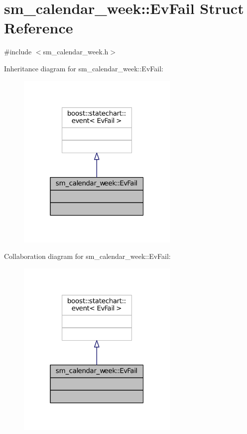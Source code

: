 \hypertarget{structsm__calendar__week_1_1EvFail}{}\section{sm\+\_\+calendar\+\_\+week\+:\+:Ev\+Fail Struct Reference}
\label{structsm__calendar__week_1_1EvFail}


{\ttfamily \#include $<$sm\+\_\+calendar\+\_\+week.\+h$>$}



Inheritance diagram for sm\+\_\+calendar\+\_\+week\+:\+:Ev\+Fail\+:
\nopagebreak
\begin{figure}[H]
\begin{center}
\leavevmode
\includegraphics[width=220pt]{structsm__calendar__week_1_1EvFail__inherit__graph}
\end{center}
\end{figure}


Collaboration diagram for sm\+\_\+calendar\+\_\+week\+:\+:Ev\+Fail\+:
\nopagebreak
\begin{figure}[H]
\begin{center}
\leavevmode
\includegraphics[width=220pt]{structsm__calendar__week_1_1EvFail__coll__graph}
\end{center}
\end{figure}


